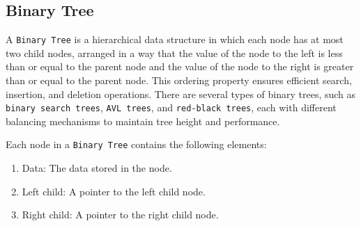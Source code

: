 

\subsection{Binary Tree}

A \lstinline{Binary Tree} is a hierarchical data structure in which each node has at most two child nodes, arranged in a way that the value of the node to the left is less than or equal to the parent node and the value of the node to the right is greater than or equal to the parent node. This ordering property ensures efficient search, insertion, and deletion operations. There are several types of binary trees, such as \lstinline{binary search trees}, \lstinline{AVL trees}, and \lstinline{red-black trees}, each with different balancing mechanisms to maintain tree height and performance\cite{mcmahon_2020}.

Each node in a \lstinline{Binary Tree} contains the following elements:
\begin{enumerate}
    \item Data: The data stored in the node.
    \item Left child: A pointer to the left child node.
    \item Right child: A pointer to the right child node.
\end{enumerate}

